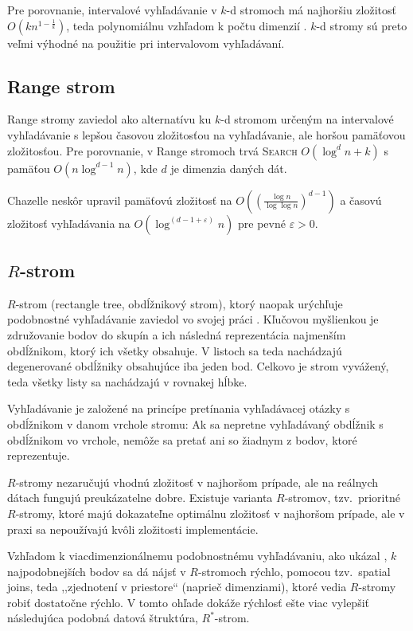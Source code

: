 \documentclass[10pt,a4paper,oneside]{article}
\begin{document}
{Pre porovnanie, intervalové vyhľadávanie v $k$-d stromoch má najhoršiu zložitosť $O(kn^{1-\frac{1}{k}})$, teda polynomiálnu vzhľadom k počtu dimenzií \citep{lee77}. $k$-d stromy sú preto veľmi výhodné na použitie pri intervalovom vyhľadávaní.

\subsection{Range strom}\label{rangetree}

Range stromy zaviedol \citet{Bentley79} ako alternatívu ku $k$-d stromom určeným na intervalové vyhľadávanie s lepšou časovou zložitosťou na vyhľadávanie, ale horšou pamäťovou zložitosťou. Pre porovnanie, v Range stromoch trvá \textsc{Search} $O(\log^d n + k)$ s pamäťou $O(n \log^{d-1} n)$, kde $d$ je dimenzia daných dát.

Chazelle neskôr upravil pamäťovú zložitosť na $O\left(\left(\frac{\log n}{\log \log n}\right)^{d-1}\right)$\citep{chazelle90p1}
a časovú zložitosť vyhľadávania na $O(\log^{(d-1+\varepsilon)} n)$\citep{chazelle90p2} pre pevné $\varepsilon > 0$.

\subsection{$R$-strom}\label{rtree}

$R$-strom (rectangle tree, obdĺžnikový strom), ktorý naopak urýchľuje podobnostné vyhľadávanie zaviedol vo svojej práci \citet{Guttman84}.
Kľučovou myšlienkou je združovanie bodov do skupín a ich následná reprezentácia najmenším obdĺžnikom, ktorý ich všetky obsahuje. V listoch sa teda nachádzajú degenerované obdĺžniky obsahujúce iba jeden bod. Celkovo je strom vyvážený, teda všetky listy sa nachádzajú v rovnakej hĺbke.

Vyhľadávanie je založené na princípe pretínania vyhľadávacej otázky s obdĺžnikom v danom vrchole stromu: Ak sa nepretne vyhľadávaný obdĺžnik s obdĺžnikom vo vrchole, nemôže sa pretať ani so žiadnym z bodov, ktoré reprezentuje.

$R$-stromy nezaručujú vhodnú zložitosť v najhoršom prípade, ale na reálnych dátach fungujú preukázatelne \citep{Hwang03} dobre. Existuje varianta $R$-stromov, tzv.~prioritné $R$-stromy, ktoré majú dokazateľne optimálnu zložitosť v najhoršom prípade, ale v praxi sa nepoužívajú kvôli zložitosti implementácie.

Vzhľadom k viacdimenzionálnemu podobnostnému vyhľadávaniu, ako ukázal \citet{brinkhoff93}, 
$k$ najpodobnejších bodov sa dá nájsť v $R$-stromoch rýchlo, pomocou tzv.~spatial joins, teda ,,zjednotení v priestore`` (naprieč dimenziami), ktoré vedia $R$-stromy robiť dostatočne rýchlo. V tomto ohľade dokáže rýchlosť ešte viac vylepšiť následujúca podobná datová štruktúra, $R^*$-strom.

}
\end{document}
